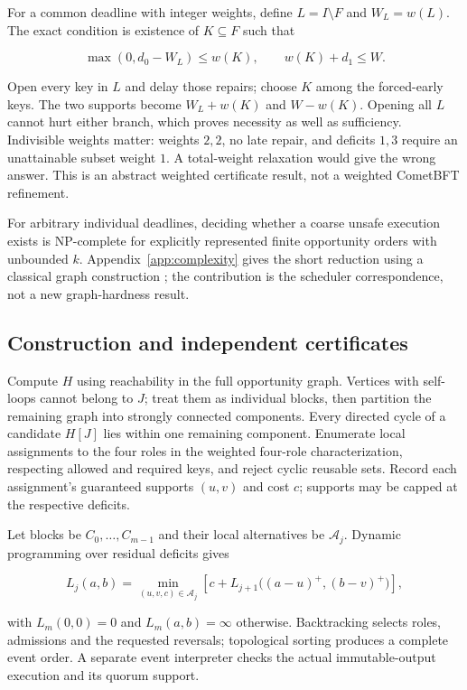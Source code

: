 For a common deadline with integer weights, define \(L=I\setminus F\)
and \(W_L=w(L)\). The exact condition is existence of \(K\subseteq F\)
such that

\[
\max(0,d_0-W_L)\le w(K),\qquad w(K)+d_1\le W. \tag{E5}\label{eq:frontier-interval}
\]

Open every key in \(L\) and delay those repairs; choose \(K\) among the
forced-early keys. The two supports become \(W_L+w(K)\) and \(W-w(K)\).
Opening all \(L\) cannot hurt either branch, which proves necessity as
well as sufficiency. Indivisible weights matter: weights \(2,2\), no
late repair, and deficits \(1,3\) require an unattainable subset weight
\(1\). A total-weight relaxation would give the wrong answer. This is an
abstract weighted certificate result, not a weighted CometBFT
refinement.

For arbitrary individual deadlines, deciding whether a coarse unsafe
execution exists is NP-complete for explicitly represented finite
opportunity orders with unbounded \(k\). Appendix~\ref{app:complexity}
gives the short reduction using a classical graph construction
\cite{karp1972reducibility}; the contribution is the scheduler
correspondence, not a new graph-hardness result.

\subsection{Construction and independent
certificates}\label{construction-and-independent-certificates}

Compute \(H\) using reachability in the full opportunity graph. Vertices
with self-loops cannot belong to \(J\); treat them as individual blocks,
then partition the remaining graph into strongly connected components.
Every directed cycle of a candidate \(H[J]\) lies within one remaining
component. Enumerate local assignments to the four roles in the weighted
four-role characterization, respecting allowed and required keys, and
reject cyclic reusable sets. Record each assignment's guaranteed
supports \((u,v)\) and cost \(c\); supports may be capped at the
respective deficits.

Let blocks be \(C_0,\ldots,C_{m-1}\) and their local alternatives be
\(\mathcal A_j\). Dynamic programming over residual deficits gives

\[
L_j(a,b)=\min_{(u,v,c)\in\mathcal A_j}
\left[c+L_{j+1}\bigl((a-u)^+,(b-v)^+\bigr)\right], \tag{E6}\label{eq:frontier-dp}
\]

with \(L_m(0,0)=0\) and \(L_m(a,b)=\infty\) otherwise. Backtracking
selects roles, admissions and the requested reversals; topological
sorting produces a complete event order. A separate event interpreter
checks the actual immutable-output execution and its quorum support.

